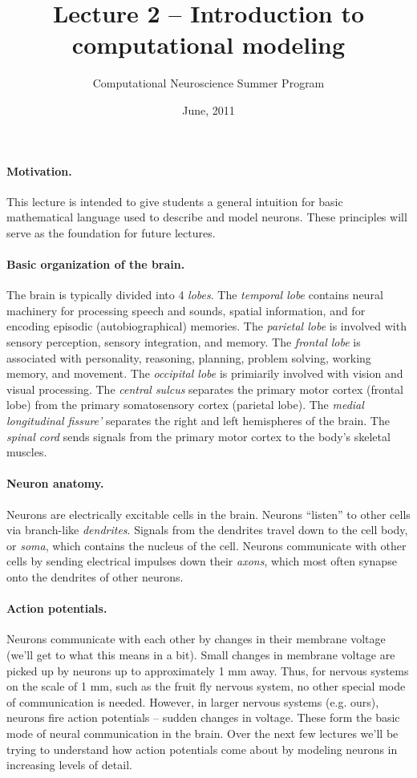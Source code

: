 \documentclass[12pt]{article}
\title{Lecture 2 -- Introduction to computational modeling}
\author{Computational Neuroscience Summer Program}
\date{June, 2011}
\begin{document}
\maketitle

\paragraph{Motivation.}  This lecture is intended to give students a general intuition for basic mathematical language used to describe and model neurons.  These principles will serve as the foundation for future lectures.

\paragraph{Basic organization of the brain.}  The brain is typically divided into 4 \textit{lobes}.  The \textit{temporal lobe} contains neural machinery for processing speech and sounds, spatial information, and for encoding episodic (autobiographical) memories.  The \textit{parietal lobe} is involved with sensory perception, sensory integration, and memory.  The \textit{frontal lobe} is associated with personality, reasoning, planning, problem solving, working memory, and movement.  The \textit{occipital lobe} is primiarily involved with vision and visual processing.  The \textit{central sulcus} separates the primary motor cortex (frontal lobe) from the primary somatosensory cortex (parietal lobe).  The \textit{medial longitudinal fissure'} separates the right and left hemispheres of the brain.  The \textit{spinal cord} sends signals from the primary motor cortex to the body's skeletal muscles.

\paragraph{Neuron anatomy.}  Neurons are electrically excitable cells in the brain.  Neurons ``listen'' to other cells via branch-like \textit{dendrites}.  Signals from the dendrites travel down to the cell body, or \textit{soma}, which contains the nucleus of the cell.  Neurons communicate with other cells by sending electrical impulses down their \textit{axons}, which most often synapse onto the dendrites of other neurons.

\paragraph{Action potentials.}  Neurons communicate with each other by changes in their membrane voltage (we'll get to what this means in a bit).  Small changes in membrane voltage are picked up by neurons up to approximately 1 mm away.  Thus, for nervous systems on the scale of 1 mm, such as the fruit fly nervous system, no other special mode of communication is needed.  However, in larger nervous systems (e.g. ours), neurons fire action potentials -- sudden changes in voltage.  These form the basic mode of neural communication in the brain.  Over the next few lectures we'll be trying to understand how action potentials come about by modeling neurons in increasing levels of detail.
\end{document}
